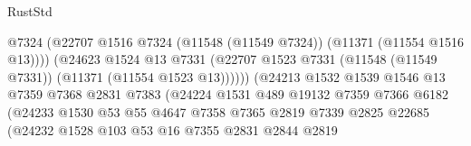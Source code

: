 \begin{lexlean}{RustStd}
\begin{coremodule}
                                            @7324
                                            (@22707
                                              @1516
                                              @7324
                                              (@11548 (@11549 @7324))
                                              (@11371 (@11554 @1516 @13))))
                                          (@24623
                                            @1524
                                            @13
                                            @7331
                                            (@22707
                                              @1523
                                              @7331
                                              (@11548 (@11549 @7331))
                                              (@11371 (@11554 @1523 @13))))))
                                      (@24213
                                        @1532
                                        @1539
                                        @1546
                                        @13
                                        @7359
                                        @7368
                                        @2831
                                        @7383
                                        (@24224
                                          @1531
                                          @489
                                          @19132
                                          @7359
                                          @7366
                                          @6182
                                          (@24233
                                            @1530
                                            @53
                                            @55
                                            @4647
                                            @7358
                                            @7365
                                            @2819
                                            @7339
                                            @2825
                                            @22685
                                            (@24232
                                              @1528
                                              @103
                                              @53
                                              @16
                                              @7355
                                              @2831
                                              @2844
                                              @2819

\end{coremodule}
\end{lexlean}
